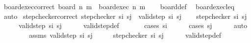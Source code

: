 \begin{isabellebody}
\ board{\isacharunderscore}{\kern0pt}exec{\isacharunderscore}{\kern0pt}correct{\isacharcolon}{\kern0pt}\ {\isachardoublequoteopen}board\ n\ m\ {\isacharequal}{\kern0pt}\ board{\isacharunderscore}{\kern0pt}exec\ n\ m{\isachardoublequoteclose}\isanewline
%
\isadelimproof
\ \ %
\endisadelimproof
%
\isatagproof
{}\isamarkupfalse%
\ board{\isacharunderscore}{\kern0pt}def\ \isamarkupfalse%
\ board{\isacharunderscore}{\kern0pt}exec{\isacharunderscore}{\kern0pt}leq\ \isamarkupfalse%
\ auto%
\endisatagproof
{\isafoldproof}%
%
\isadelimproof
\isanewline
%
\endisadelimproof
\isanewline
{}\isamarkupfalse%
\ step{\isacharunderscore}{\kern0pt}checker{\isacharunderscore}{\kern0pt}correct{\isacharcolon}{\kern0pt}\ {\isachardoublequoteopen}step{\isacharunderscore}{\kern0pt}checker\ s\isactrlsub i\ s\isactrlsub j\ {\isasymlongleftrightarrow}\ valid{\isacharunderscore}{\kern0pt}step\ s\isactrlsub i\ s\isactrlsub j{\isachardoublequoteclose}\isanewline
%
\isadelimproof
%
\endisadelimproof
%
\isatagproof
{}\isamarkupfalse%
\isanewline
\ \ \isamarkupfalse%
\ {\isachardoublequoteopen}step{\isacharunderscore}{\kern0pt}checker\ s\isactrlsub i\ s\isactrlsub j{\isachardoublequoteclose}\isanewline
\ \ \isamarkupfalse%
\ \isamarkupfalse%
\ {\isachardoublequoteopen}valid{\isacharunderscore}{\kern0pt}step\ s\isactrlsub i\ s\isactrlsub j{\isachardoublequoteclose}\isanewline
\ \ \ \ \isamarkupfalse%
\ valid{\isacharunderscore}{\kern0pt}step{\isacharunderscore}{\kern0pt}def\ \isanewline
\ \ \ \ \isamarkupfalse%
\ {\isacharparenleft}{\kern0pt}cases\ s\isactrlsub i{\isacharparenright}{\kern0pt}\isanewline
\ \ \ \ \isamarkupfalse%
\ {\isacharparenleft}{\kern0pt}cases\ s\isactrlsub j{\isacharparenright}{\kern0pt}\isanewline
\ \ \ \ \isamarkupfalse%
\ auto\isanewline
\ \ \ \ \isamarkupfalse%
\isanewline
{}\isamarkupfalse%
\isanewline
\ \ \isamarkupfalse%
\ assms{\isacharcolon}{\kern0pt}\ {\isachardoublequoteopen}valid{\isacharunderscore}{\kern0pt}step\ s\isactrlsub i\ s\isactrlsub j{\isachardoublequoteclose}\isanewline
\ \ \isamarkupfalse%
\ \isamarkupfalse%
\ {\isachardoublequoteopen}step{\isacharunderscore}{\kern0pt}checker\ s\isactrlsub i\ s\isactrlsub j{\isachardoublequoteclose}\isanewline
\ \ \ \ \isamarkupfalse%
\ valid{\isacharunderscore}{\kern0pt}step{\isacharunderscore}{\kern0pt}def\ \isamarkupfalse%

\end{isabellebody}
